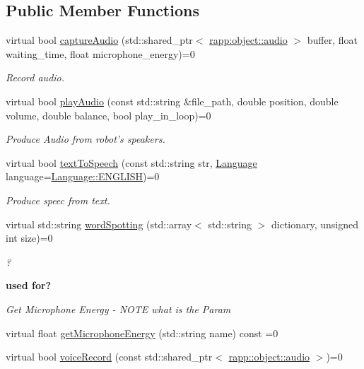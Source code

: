 \subsection*{Public Member Functions}
\begin{DoxyCompactItemize}
\item 
virtual bool \hyperlink{classrapp_1_1robot_1_1communication_ab33428a7ba5c82056fe5942efbd2ce2d}{capture\-Audio} (std\-::shared\-\_\-ptr$<$ \hyperlink{classrapp_1_1object_1_1audio}{rapp\-:object\-::audio} $>$ buffer, float waiting\-\_\-time, float microphone\-\_\-energy)=0
\begin{DoxyCompactList}\small\item\em Record audio. \end{DoxyCompactList}\item 
virtual bool \hyperlink{classrapp_1_1robot_1_1communication_ab38cea79d2b7fdeecdeebf02ddad3341}{play\-Audio} (const std\-::string \&file\-\_\-path, double position, double volume, double balance, bool play\-\_\-in\-\_\-loop)=0
\begin{DoxyCompactList}\small\item\em Produce Audio from robot's speakers. \end{DoxyCompactList}\item 
virtual bool \hyperlink{classrapp_1_1robot_1_1communication_a04d8ae71d953aa66a4c00149548ad750}{text\-To\-Speech} (const std\-::string str, \hyperlink{classrapp_1_1robot_1_1communication_aa68950f71c5f18df6816725b50c3c62e}{Language} language=\hyperlink{classrapp_1_1robot_1_1communication_aa68950f71c5f18df6816725b50c3c62ea11040bd29db4ec9964af9fd3f9a24f17}{Language\-::\-E\-N\-G\-L\-I\-S\-H})=0
\begin{DoxyCompactList}\small\item\em Produce speec from text. \end{DoxyCompactList}\item 
virtual std\-::string \hyperlink{classrapp_1_1robot_1_1communication_aeddb446d64faad99717229870caa9927}{word\-Spotting} (std\-::array$<$ std\-::string $>$ dictionary, unsigned int size)=0
\begin{DoxyCompactList}\small\item\em ? \end{DoxyCompactList}\end{DoxyCompactItemize}
\begin{Indent}{\bf used for?}\par
{\em Get Microphone Energy -\/ N\-O\-T\-E what is the Param }\begin{DoxyCompactItemize}
\item 
virtual float \hyperlink{classrapp_1_1robot_1_1communication_a8baa4b3616a74e22bbf0455122eb695d}{get\-Microphone\-Energy} (std\-::string name) const =0
\item 
virtual bool \hyperlink{classrapp_1_1robot_1_1communication_ac47da76d51faee1744d0521e1f7aac25}{voice\-Record} (const std\-::shared\-\_\-ptr$<$ \hyperlink{classrapp_1_1object_1_1audio}{rapp\-::object\-::audio} $>$)=0
\end{DoxyCompactItemize}
\end{Indent}


